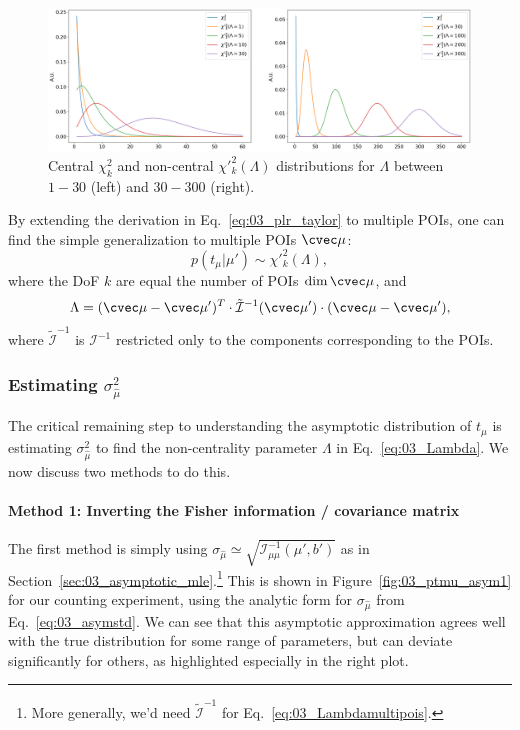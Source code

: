 \begin{figure}[htb]
  \centering
  \includegraphics[width=\textwidth]{figures/03-Stats/06-asymptotic-plr/1.png}
  \caption{Central $\chi^2_k$ and non-central $\chi'^2_k(\Lambda)$ distributions for $\Lambda$ between $1-30$ (left) and $30-300$ (right).}
  \label{fig:03_noncentralchi2}
\end{figure}

By extending the derivation in Eq.~\ref{eq:03_plr_taylor} to multiple POIs, one can find the simple generalization to multiple POIs $\cvec\mu$:
\begin{equation}
p(t_\mu|\mu') \sim \chi'^2_k(\Lambda),
\label{eq:03_chi2multipois}
\end{equation}
where the DoF $k$ are equal the number of POIs $\dim\cvec\mu$, and 
\begin{equation}
\Lambda = (\cvec\mu - \cvec\mu')^T \cdot \tilde{\mathcal I}^{-1}(\cvec\mu') \cdot (\cvec\mu - \cvec\mu'),
\label{eq:03_Lambdamultipois}
\end{equation}
where $\tilde{\mathcal I}^{-1}$ is $\mathcal I^{-1}$ restricted only to the components corresponding to the POIs.


\subsubsection{Estimating \texorpdfstring{$\sigma_{\hat\mu}^2$}{σ2}}

The critical remaining step to understanding the asymptotic distribution of $t_\mu$ is estimating $\sigma_{\hat\mu}^2$ to find the non-centrality parameter $\Lambda$ in Eq.~\ref{eq:03_Lambda}.
We now discuss two methods to do this.

\paragraph{Method 1: Inverting the Fisher information / covariance matrix}

The first method is simply using $\sigma_{\hat\mu} \simeq \sqrt{\mathcal I^{-1}_{\mu\mu}(\mu', b')}$ as in Section~\ref{sec:03_asymptotic_mle}.\footnote{More generally, we'd need $\tilde{\mathcal I}^{-1}$ for Eq.~\ref{eq:03_Lambdamultipois}.}
This is shown in Figure~\ref{fig:03_ptmu_asym1} for our counting experiment, using the analytic form for $\sigma_{\hat\mu}$ from Eq.~\ref{eq:03_asymstd}.
We can see that this asymptotic approximation agrees well with the true distribution for some range of parameters, but can deviate significantly for others, as highlighted especially in the right plot.


